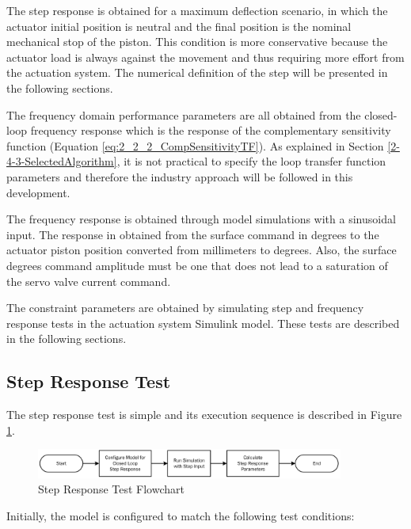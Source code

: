 The step response is obtained for a maximum deflection scenario, in which the actuator initial position is neutral and the final position is the nominal mechanical stop of the piston. This condition is more conservative because the actuator load is always against the movement and thus requiring more effort from the actuation system. The numerical definition of the step will be presented in the following sections.

The frequency domain performance parameters are all obtained from the closed-loop frequency response which is the response of the complementary sensitivity function (Equation \ref{eq:2_2_2_CompSensitivityTF}). As explained in Section \ref{2-4-3-SelectedAlgorithm}, it is not practical to specify the loop transfer function parameters and therefore the industry approach will be followed in this development.

The frequency response is obtained through model simulations with a sinusoidal input. The response in obtained from the surface command in degrees to the actuator piston position converted from millimeters to degrees. Also, the surface degrees command amplitude must be one that does not lead to a saturation of the servo valve current command.

The constraint parameters are obtained by simulating step and frequency response tests in the actuation system Simulink model. These tests are described in the following sections.

\subsection{Step Response Test} \label{4-3-1-StepRespTest}

The step response test is simple and its execution sequence is described in Figure \ref{fig:4_3_1_TimeResponseFlowchart}.  

\begin{figure}[H]
	\centering
	\centerline{\includegraphics[width=0.9\textwidth]{Figuras/4.DynamicStifinessOptimizationAlgorithm/4-3-1-TimeResponse.jpg}}
	\caption{Step Response Test Flowchart}
	\label{fig:4_3_1_TimeResponseFlowchart}
\end{figure}

Initially, the model is configured to match the following test conditions:

